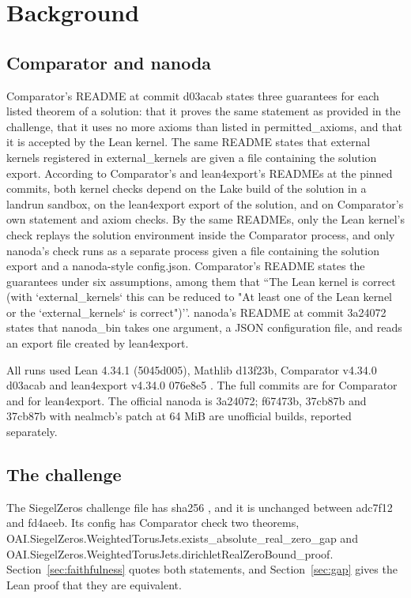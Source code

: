 \section{Background}\label{sec:background}

\subsection{Comparator and nanoda}

Comparator's README at commit d03acab \cite{comparator} states three guarantees for each listed theorem of a solution: that it proves the same statement as provided in the challenge, that it uses no more axioms than listed in permitted\_axioms, and that it is accepted by the Lean kernel.
The same README states that external kernels registered in external\_kernels are given a file containing the solution export.
According to Comparator's and lean4export's READMEs at the pinned commits, both kernel checks depend on the Lake build of the solution in a landrun sandbox, on the lean4export export of the solution, and on Comparator's own statement and axiom checks.
By the same READMEs, only the Lean kernel's check replays the solution environment inside the Comparator process, and only nanoda's check runs as a separate process given a file containing the solution export and a nanoda-style config.json.
Comparator's README states the guarantees under six assumptions, among them that ``The Lean kernel is correct (with `external\_kernels` this can be reduced to "At least one of the Lean kernel or the `external\_kernels` is correct")''.
nanoda's README at commit 3a24072 \cite{nanoda-lib} states that nanoda\_bin takes one argument, a JSON configuration file, and reads an export file created by lean4export.

All runs used Lean 4.34.1 (5045d005), Mathlib d13f23b, Comparator v4.34.0 d03acab and lean4export v4.34.0 076e8e5 \cite{lean4,mathlib,comparator,lean4export}.
The full commits are  for Comparator and  for lean4export.
The official nanoda is 3a24072; f67473b, 37cb87b and 37cb87b with nealmcb's patch at 64 MiB are unofficial builds, reported separately.

\subsection{The challenge}

The SiegelZeros challenge file has sha256 , and it is unchanged between adc7f12 and fd4aeeb.
Its config has Comparator check two theorems, OAI.SiegelZeros.WeightedTorusJets.exists\_absolute\_real\_zero\_gap and OAI.SiegelZeros.WeightedTorusJets.dirichletRealZeroBound\_proof.
Section~\ref{sec:faithfulness} quotes both statements, and Section~\ref{sec:gap} gives the Lean proof that they are equivalent.

